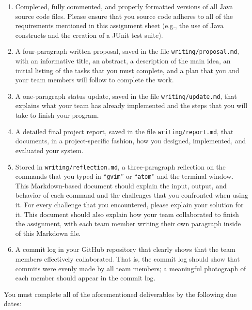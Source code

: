 \documentclass[11pt]{article}
\newcommand{\reflection}{\lstinline{writing/reflection.md}}
\newcommand{\command}[1]{``\lstinline{#1}''}
\newcommand{\program}[1]{\lstinline{#1}}
\begin{document}
\begin{enumerate}

  \setlength{\itemsep}{0in}

\item Completed, fully commented, and properly formatted versions of all Java
  source code files. Please ensure that you source code adheres to all of the
  requirements mentioned in this assignment sheet (e.g., the use of Java
  constructs and the creation of a JUnit test suite).

\item A four-paragraph written proposal, saved in the file
  \program{writing/proposal.md}, with an informative title, an abstract, a
  description of the main idea, an initial listing of the tasks that you must
  complete, and a plan that you and your team members will follow to complete
  the work.

\item A one-paragraph status update, saved in the file
  \program{writing/update.md}, that explains what your team has already
  implemented and the steps that you will take to finish your program.

\item A detailed final project report, saved in the file
  \program{writing/report.md}, that documents, in a project-specific fashion,
  how you designed, implemented, and evaluated your system.

\item Stored in \reflection{}, a three-paragraph reflection on the commands
  that you typed in \command{gvim} or \command{atom} and the terminal window.
  This Markdown-based document should explain the input, output, and behavior
  of each command and the challenges that you confronted when using it. For
  every challenge that you encountered, please explain your solution for it.
  This document should also explain how your team collaborated to finish the
  assignment, with each team member writing their own paragraph inside of this
  Markdown file.

\item A commit log in your GitHub repository that clearly shows that the team
  members effectively collaborated. That is, the commit log should show that
  commits were evenly made by all team members; a meaningful photograph of each
  member should appear in the commit log.

\end{enumerate}

\noindent You must complete all of the aforementioned deliverables by the
following due dates:
\end{document}
